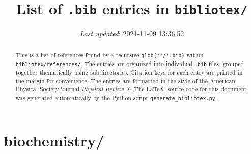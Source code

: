 \documentclass[letterpaper, 10pt, oneside, openany]{report}
\title{List of \texttt{.bib} entries in \texttt{bibliotex/}}
\date{\textit{Last updated}: 2021-11-09 13:36:52}
\begin{document}
\maketitle

\begin{abstract}
	This is a list of references found by a recursive \texttt{glob(**/*.bib)} within \texttt{bibliotex/references/}.
	The entries are organized into individual \texttt{.bib} files, grouped together thematically using subdirectories.
	Citation keys for each entry are printed in the margin for convenience.
	The entries are formatted in the style of the American Physical Society journal \emph{Physical Review X}.
	The \LaTeX\ source code for this document was generated automatically by the Python script \texttt{generate\_bibliotex.py}.
\end{abstract}

\tableofcontents

\chapter*{biochemistry/}

\begin{refsection}
	\nocite{*}
	\printbibliography[title = {Mg-ATP.bib}, heading = subbibintoc]
\end{refsection}

\begin{refsection}
	\nocite{*}
	\printbibliography[title = {Mg-DNA.bib}, heading = subbibintoc]
\end{refsection}

\begin{refsection}
	\nocite{*}
	\printbibliography[title = {Mg-OAc.bib}, heading = subbibintoc]
\end{refsection}

\begin{refsection}
	\nocite{*}
	\printbibliography[title = {Mg.bib}, heading = subbibintoc]
\end{refsection}

\begin{refsection}
	\nocite{*}
	\printbibliography[title = {misc.bib}, heading = subbibintoc]
\end{refsection}

\begin{refsection}
	\nocite{*}
	\printbibliography[title = {nmr-proteins.bib}, heading = subbibintoc]
\end{refsection}
\end{document}
